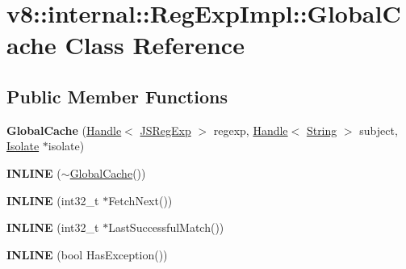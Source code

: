 \hypertarget{classv8_1_1internal_1_1_reg_exp_impl_1_1_global_cache}{}\section{v8\+:\+:internal\+:\+:Reg\+Exp\+Impl\+:\+:Global\+Cache Class Reference}
\label{classv8_1_1internal_1_1_reg_exp_impl_1_1_global_cache}
\subsection*{Public Member Functions}
\begin{DoxyCompactItemize}
\item 
{\bfseries Global\+Cache} (\hyperlink{classv8_1_1internal_1_1_handle}{Handle}$<$ \hyperlink{classv8_1_1internal_1_1_j_s_reg_exp}{J\+S\+Reg\+Exp} $>$ regexp, \hyperlink{classv8_1_1internal_1_1_handle}{Handle}$<$ \hyperlink{classv8_1_1internal_1_1_string}{String} $>$ subject, \hyperlink{classv8_1_1internal_1_1_isolate}{Isolate} $\ast$isolate)\hypertarget{classv8_1_1internal_1_1_reg_exp_impl_1_1_global_cache_a68112a559c6aa3991941c11353938140}{}\label{classv8_1_1internal_1_1_reg_exp_impl_1_1_global_cache_a68112a559c6aa3991941c11353938140}

\item 
{\bfseries I\+N\+L\+I\+NE} ($\sim$\hyperlink{classv8_1_1internal_1_1_reg_exp_impl_1_1_global_cache}{Global\+Cache}())\hypertarget{classv8_1_1internal_1_1_reg_exp_impl_1_1_global_cache_a7d66100b3be114742bdfe955c6e4f861}{}\label{classv8_1_1internal_1_1_reg_exp_impl_1_1_global_cache_a7d66100b3be114742bdfe955c6e4f861}

\item 
{\bfseries I\+N\+L\+I\+NE} (int32\+\_\+t $\ast$Fetch\+Next())\hypertarget{classv8_1_1internal_1_1_reg_exp_impl_1_1_global_cache_a1b2facfe08b530e688d947045cb41c31}{}\label{classv8_1_1internal_1_1_reg_exp_impl_1_1_global_cache_a1b2facfe08b530e688d947045cb41c31}

\item 
{\bfseries I\+N\+L\+I\+NE} (int32\+\_\+t $\ast$Last\+Successful\+Match())\hypertarget{classv8_1_1internal_1_1_reg_exp_impl_1_1_global_cache_a70396bcf345974efd7d64a84f501d5dc}{}\label{classv8_1_1internal_1_1_reg_exp_impl_1_1_global_cache_a70396bcf345974efd7d64a84f501d5dc}

\item 
{\bfseries I\+N\+L\+I\+NE} (bool Has\+Exception())\hypertarget{classv8_1_1internal_1_1_reg_exp_impl_1_1_global_cache_a3039a1845cc2c971c770591de083f7d3}{}\label{classv8_1_1internal_1_1_reg_exp_impl_1_1_global_cache_a3039a1845cc2c971c770591de083f7d3}

\end{DoxyCompactItemize}
